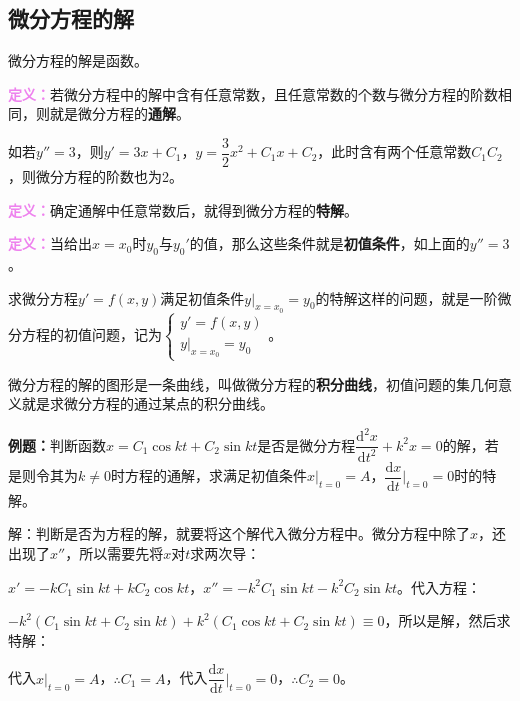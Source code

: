 \documentclass[UTF8, 12pt]{ctexart}
\begin{document}
        \subsection{微分方程的解}

        微分方程的解是函数。

        \textcolor{violet}{\textbf{定义：}}若微分方程中的解中含有任意常数，且任意常数的个数与微分方程的阶数相同，则就是微分方程的\textbf{通解}。

        如若$y''=3$，则$y'=3x+C_1$，$y=\dfrac{3}{2}x^2+C_1x+C_2$，此时含有两个任意常数$C_1C_2$，则微分方程的阶数也为2。

        \textcolor{violet}{\textbf{定义：}}确定通解中任意常数后，就得到微分方程的\textbf{特解}。

        \textcolor{violet}{\textbf{定义：}}当给出$x=x_0$时$y_0$与$y_0'$的值，那么这些条件就是\textbf{初值条件}，如上面的$y''=3$。

        求微分方程$y'=f(x,y)$满足初值条件$y\vert_{x=x_0}=y_0$的特解这样的问题，就是一阶微分方程的初值问题，记为$\left\{\begin{array}{l}
                                                                                                                         y'=f(x,y) \\
                                                                                                                         y\vert_{x=x_0}=y_0
        \end{array}
        \right.$。

        微分方程的解的图形是一条曲线，叫做微分方程的\textbf{积分曲线}，初值问题的集几何意义就是求微分方程的通过某点的积分曲线。

        \textbf{例题：}判断函数$x=C_1\cos kt+C_2\sin kt$是否是微分方程$\dfrac{\textrm{d}^2x}{\textrm{d}t^2}+k^2x=0$的解，若是则令其为$k\neq0$时方程的通解，求满足初值条件$x\vert_{t=0}=A$，$\dfrac{\textrm{d}x}{\textrm{d}t}\bigg\vert_{t=0}=0$时的特解。

        解：判断是否为方程的解，就要将这个解代入微分方程中。微分方程中除了$x$，还出现了$x''$，所以需要先将$x$对$t$求两次导：

        $x'=-kC_1\sin kt+kC_2\cos kt$，$x''=-k^2C_1\sin kt-k^2C_2\sin kt$。代入方程：

        $-k^2(C_1\sin kt+C_2\sin kt)+k^2(C_1\cos kt+C_2\sin kt)\equiv0$，所以是解，然后求特解：

        代入$x\vert_{t=0}=A$，$\therefore C_1=A$，代入$\dfrac{\textrm{d}x}{\textrm{d}t}\bigg\vert_{t=0}=0$，$\therefore C_2=0$。
\end{document}

